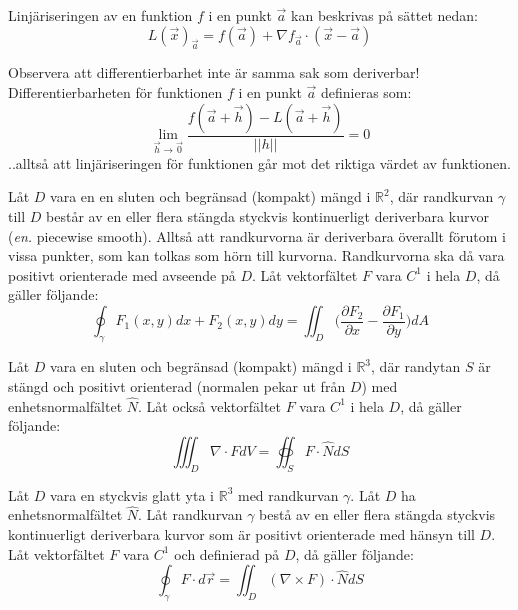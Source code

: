 \documentclass{report}
\begin{document}
{
Linjäriseringen av en funktion $f$ i en punkt $\vec{a}$ kan beskrivas på sättet nedan:
\begin{equation*}
	L(\vec{x})_{\vec{a}} = f(\vec{a}) + \nabla f_{\vec{a}} \cdot (\vec{x}-\vec{a})
\end{equation*}
}

{
Observera att differentierbarhet inte är samma sak som deriverbar! Differentierbarheten för funktionen $f$ i en punkt $\vec{a}$ definieras som:
\begin{equation*}
\lim_{\vec{h} \to \vec{0}} \frac{f(\vec{a}+\vec{h})-L(\vec{a}+\vec{h})}{||h||} = 0
\end{equation*}
..alltså att linjäriseringen för funktionen går mot det riktiga värdet av funktionen. 
}

{
	Låt $D$ vara en en sluten och begränsad (kompakt) mängd i $\mathbb{R}^2$, där randkurvan $\gamma$ till $D$ består av en eller flera stängda styckvis kontinuerligt deriverbara kurvor (\textit{en.} piecewise smooth). Alltså att randkurvorna är deriverbara överallt förutom i vissa punkter, som kan tolkas som hörn till kurvorna. Randkurvorna ska då vara positivt orienterade med avseende på $D$. Låt vektorfältet $F$ vara $C^1$ i hela $D$, då gäller följande:
	\begin{equation*}
		\oint_{\gamma} F_1(x,y)dx + F_2(x,y)dy = \iint_D \bigl(\frac{\partial F_2}{\partial x} - \frac{\partial F_1}{\partial y}\bigr) dA
	\end{equation*}
}	

{
	Låt $D$ vara en sluten och begränsad (kompakt) mängd i $\mathbb{R}^3$, där randytan $S$ är stängd och positivt orienterad (normalen pekar ut från $D$) med enhetsnormalfältet $\hat{N}$. Låt också vektorfältet $F$ vara $C^1$ i hela $D$, då gäller följande:
	\begin{equation*}
		\iiint_D \nabla \cdot F dV = \oiint_S F \cdot \hat{N} dS
	\end{equation*}
}

{
	Låt $D$ vara en styckvis glatt yta i $\mathbb{R}^3$ med randkurvan $\gamma$. Låt $D$ ha enhetsnormalfältet $\hat{N}$. Låt randkurvan $\gamma$ bestå av en eller flera stängda styckvis kontinuerligt deriverbara kurvor som är positivt orienterade med hänsyn till $D$. Låt vektorfältet $F$ vara $C^1$ och definierad på $D$, då gäller följande:
	\begin{equation*}
		\oint_{\gamma} F \cdot d\vec{r} = \iint_D (\nabla \times F) \cdot \hat{N} dS
	\end{equation*}
}
\end{document}
